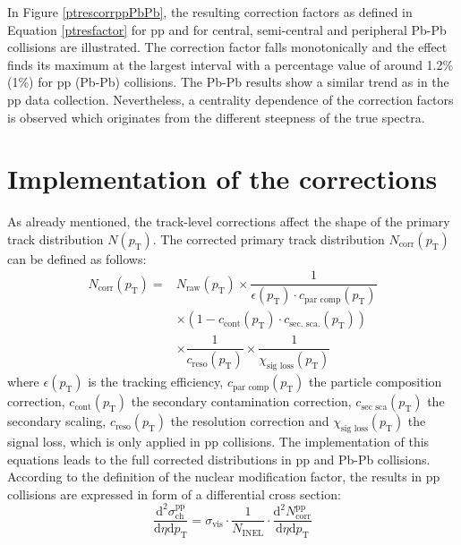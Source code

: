 \documentclass[12pt,a4paper]{report}
\begin{document}
In Figure \ref{ptrescorrppPbPb}, the resulting correction factors as defined in Equation \ref{ptresfactor} for pp and for central, semi-central and peripheral Pb-Pb collisions are illustrated. The correction factor falls monotonically and the effect finds its maximum at the largest \pt interval with a percentage value of around 1.2\% (1\%) for pp (Pb-Pb) collisions. The Pb-Pb results show a similar trend as in the pp data collection. Nevertheless, a centrality dependence of the correction factors is observed which originates from the different steepness of the true \pt spectra.
\section{Implementation of the corrections}
\label{secCorr}
As already mentioned, the track-level corrections affect the shape of the primary track distribution $N(p_\text{T})$. The corrected primary track distribution $N_\text{corr}(p_\text{T})$ can be defined as follows:
\begin{equation}
\begin{split}
N_\text{corr}(p_\text{T}) = &  N_\text{raw}(p_\text{T}) \times \dfrac{1}{\epsilon(p_\text{T}) \cdot c_\text{par comp}(p_\text{T})} \\
& \times (1 - c_\text{cont}(p_\text{T}) \cdot c_\text{sec. sca.}(p_\text{T})) \\
&\times \dfrac{1}{c_\text{reso}(p_\text{T})} \times \dfrac{1}{\chi_\text{sig loss}(p_\text{T})} 
\end{split}
\end{equation}
where $\epsilon(p_\text{T})$ is the tracking efficiency, $c_\text{par comp}(p_\text{T})$ the particle composition correction, $c_\text{cont}(p_\text{T})$ the secondary contamination correction, $c_\text{sec sca}(p_\text{T})$ the secondary scaling, $c_\text{reso}(p_\text{T})$ the \pt resolution correction and $\chi_\text{sig loss}(p_\text{T})$ the signal loss, which is only applied in pp collisions. The implementation of this equations leads to the full corrected \pt distributions in pp and Pb-Pb collisions. According to the definition of the nuclear modification factor, the results in pp collisions are expressed in form of a differential cross section: 
\begin{equation}
\label{EqdiffCross}
\dfrac{\text{d}^2 \sigma^\text{pp}_\text{ch} }{\text{d}\eta \text{d}p_\text{T}} = \sigma_\text{vis} \cdot \dfrac{1}{N_\text{INEL}} \cdot \dfrac{\text{d}^2 N^\text{pp}	_\text{corr}}{\text{d}\eta \text{d}p_\text{T}}
\end{equation}
\end{document}
